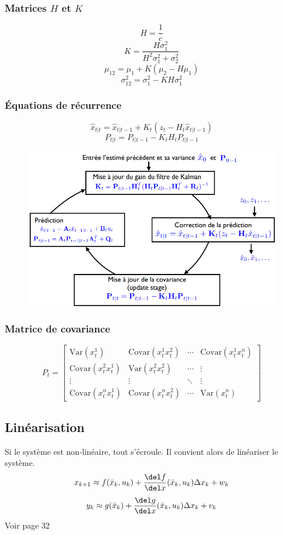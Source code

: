 \documentclass[resume]{subfiles}
\begin{document}
\subsubsection{Matrices $H$ et $K$}
$$H=\frac{1}{c}$$
$$K=\frac{H\sigma_1^2}{H^2\sigma_1^2+\sigma_2^2}$$
$$\mu_{12}=\mu_1+K(\mu_2-H\mu_1)$$
$$\sigma_{12}^2=\sigma_1^2-KH\sigma_1^2$$
\subsubsection{Équations de récurrence}
$$\hat{x}_{t|t}=\hat{x}_{t|t-1}+K_t(z_t-H_t\hat{x}_{t|t-1})$$
$$P_{t|t}=P_{t|t-1}-K_tH_tP_{t|t-1}$$
\begin{figure}[H]
\centering
\includegraphics[width=\columnwidth]{img_22.png}
\end{figure}








\subsubsection{Matrice de covariance}
$$P_t=\begin{bmatrix}
\text{Var}(x_t^{1}) & \text{Covar}(x_t^{1}x_t^{2}) & \cdots & \text{Covar}(x_t^{1}x_t^{n})\\
\text{Covar}(x_t^{2}x_t^{1}) & \text{Var}(x_t^{2}x_t^{2}) & \cdots & \vdots\\
\vdots & \vdots & \ddots & \vdots\\
\text{Covar}(x_t^{n}x_t^{1}) & \text{Covar}(x_t^{n}x_t^{2}) & \cdots & \text{Var}(x_t^{n})
\end{bmatrix}$$
\subsection{Linéarisation}
Si le système est non-linéaire, tout s'écroule. Il convient alors de linéariser le système.
$$x_{k+1}\approx f(\bar{x}_k,u_k)+\frac{\del f}{\del x}(\bar{x}_k,u_k)\Delta x_k+w_k$$
$$y_k\approx g(\bar{x}_k)+\frac{\del g}{\del x}(\bar{x}_k,u_k)\Delta x_k+v_k$$
Voir page 32
\end{document}
